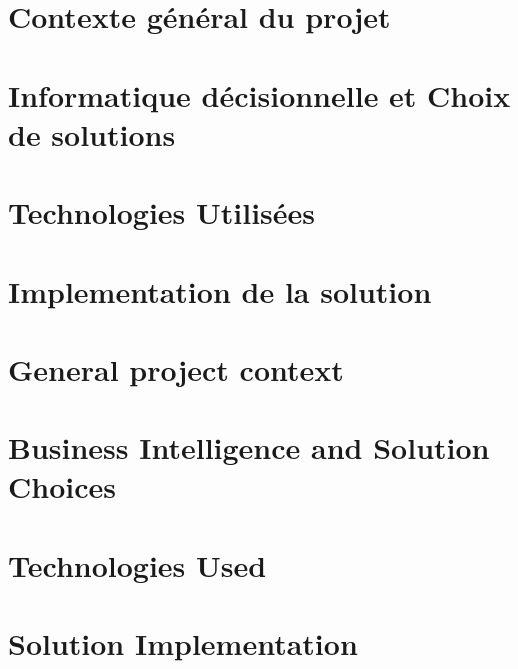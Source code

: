 \documentclass{iid}
\begin{document}
\ifnum{}
    \chapter{Contexte général du projet}\label{chap:1}
    \minitoc
    
    \chapter{Informatique décisionnelle et Choix de solutions}\label{chap:2}
    

    \chapter{Technologies Utilisées}\label{chap:3}
    

    \chapter{Implementation de la solution}\label{chap:4}
    

\else
    \chapter{General project context}\label{chap:1}
    

    \chapter{Business Intelligence and Solution Choices}\label{chap:2}
    

    \chapter{Technologies Used}\label{chap:3}
    

    \chapter{Solution Implementation}\label{chap:4}
    
\fi
 
% 
\ifnum{}
    
\else
    
\fi
% 
\lhead[]{} \rhead[]{} \chead[]{}

% 
% 


%
\end{document}
